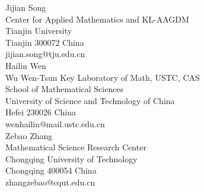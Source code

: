 \documentclass[11pt]{amsart}
\theoremstyle{plain}
\theoremstyle{definition}
\numberwithin{equation}{section}
\begin{document}
{\small {\sc  \noindent Jijian Song\\
Center for Applied Mathematics and KL-AAGDM\\
Tianjin University\\
Tianjin 300072 China}\\
jijian.song@tju.edu.cn\\


{\sc \noindent Hailin Wen\\
Wu Wen-Tsun Key Laboratory of Math, USTC, CAS\\
School of Mathematical Sciences\\
University of Science and Technology of China\\
Hefei 230026 China}\\
wenhailin@mail.ustc.edu.cn\\


{\sc \noindent Zebao Zhang\\
Mathematical Science Research Center\\
Chongqing University of Technology\\
Chongqing 400054 China}\\
zhangzebao@cqut.edu.cn}\\


\fussy
\end{document}

